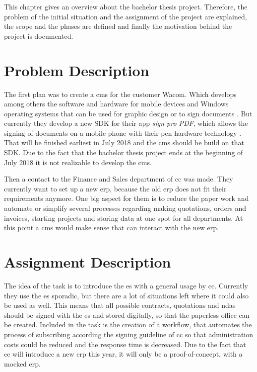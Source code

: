  This chapter gives an overview about the bachelor thesis project. Therefore, the problem of the initial situation and the assignment of the project are explained, the scope and the phases are defined and finally the motivation behind the project is documented.
 
 \section{Problem Description}
 The first plan was to create a \gls{cms} for the customer Wacom. Which develops among others the software and hardware for mobile devices and Windows operating systems that can be used for graphic design or to sign documents \parencite{wacom2018about}. But currently they develop a new \gls{SDK} for their \gls{app} \textit{sign pro PDF}, which allows the signing of documents on a mobile phone with their pen hardware technology \parencite{wacom2018sign}. That will be finished earliest in July 2018 and the \gls{cms} should be build on that \gls{SDK}. Due to the fact that the bachelor thesis project ends at the beginning of July 2018 it is not realizable to develop the \gls{cms}.
 
 Then a contact to the Finance and Sales department of \gls{cc} was made. They currently want to set up a new \gls{erp}, because the old \gls{erp} does not fit their requirements anymore. One big aspect for them is to reduce the paper work and automate or simplify several processes regarding making quotations, orders and invoices, starting projects and storing data at one spot for all departments. At this point a \gls{cms} would make sense that can interact with the new \gls{erp}.

 \section{Assignment Description}
 The idea of the task is to introduce the \gls{es} with a general usage by \gls{cc}. Currently they use the \gls{es} sporadic, but there are a lot of situations left where it could also be used as well.
 This means that all possible contracts, quotations and \glspl{nda} should be signed with the \gls{es} and stored digitally, so that the paperless office can be created. Included in the task is the creation of a workflow, that automates the process of subscribing according the signing guideline of \gls{cc} so that administration costs could be reduced and the response time is decreased. Due to the fact that \gls{cc} will introduce a new \gls{erp} this year, it will only be a proof-of-concept, with a mocked \gls{erp}.
 
